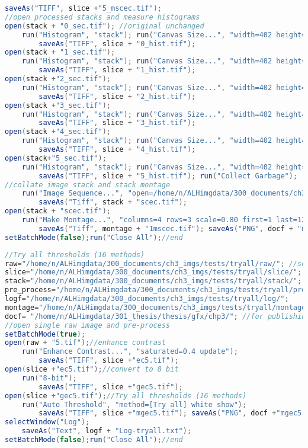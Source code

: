 \begin{lstlisting}[language=java, caption=Stack pre-processing examples.,  label=cd:pre-process-stacks]
		saveAs("TIFF", slice +"5_mscec.tif");
//open processed stacks and measure histograms
open(stack + "0_sec.tif"); //original unchanged
	run("Histogram", "stack"); run("Canvas Size...", "width=402 height=402 position=Center zero");
		saveAs("TIFF", slice + "0_hist.tif"); 
open(stack + "1_sec.tif");
	run("Histogram", "stack"); run("Canvas Size...", "width=402 height=402  position=Center zero");
		saveAs("TIFF", slice + "1_hist.tif");
open(stack +"2_sec.tif");
	run("Histogram", "stack"); run("Canvas Size...", "width=402 height=402  position=Center zero");
		saveAs("TIFF", slice + "2_hist.tif");
open(stack +"3_sec.tif");
	run("Histogram", "stack"); run("Canvas Size...", "width=402 height=402  position=Center zero");
		saveAs("TIFF", slice + "3_hist.tif");
open(stack +"4_sec.tif");	
	run("Histogram", "stack"); run("Canvas Size...", "width=402 height=402  position=Center zero");
		saveAs("TIFF", slice + "4_hist.tif");
open(stack+"5_sec.tif");
	run("Histogram", "stack"); run("Canvas Size...", "width=402 height=402  position=Center zero");
		saveAs("TIFF", slice + "5_hist.tif"); run("Collect Garbage");
//collate image stack and stack montage 
	run("Image Sequence...", "open=/home/n/ALHimgdata/300_documents/ch3_imgs/tests/pre_processing/slice/0_sec.tif sort");
		saveAs("Tiff", stack + "scec.tif");	
open(stack + "scec.tif");
	run("Make Montage...", "columns=4 rows=3 scale=0.80 first=1 last=12 increment=1 border=4 font=20 label");
		saveAs("Tiff", montage + "1mscec.tif"); saveAs("PNG", docf + "mscec.png");
setBatchMode(false);run("Close All");//end
\end{lstlisting}

\begin{lstlisting}[language=java, caption=Thresholding tests., label=cd:tryall-threshold]
//Try all thresholds (16 methods)
raw="/home/n/ALHimgdata/300_documents/ch3_imgs/tests/tryall/raw/"; //source and output dir
slice="/home/n/ALHimgdata/300_documents/ch3_imgs/tests/tryall/slice/"; 
stack="/home/n/ALHimgdata/300_documents/ch3_imgs/tests/tryall/stack/";
pre_process="/home/n/ALHimgdata/300_documents/ch3_imgs/tests/tryall/pre_process/";
logf="/home/n/ALHimgdata/300_documents/ch3_imgs/tests/tryall/log/"; 
montage="/home/n/ALHimgdata/300_documents/ch3_imgs/tests/tryall/montage/";
docf= "/home/n/ALHimgdata/301_thesis/thesis/gfx/chp3/"; //for publishing images
//open single raw image and pre-process
setBatchMode(true);
open(raw + "5.tif");//enhance contrast
	run("Enhance Contrast...", "saturated=0.4 update");
		saveAs("TIFF", slice +"ec5.tif");
open(slice +"ec5.tif");//convert to 8 bit
	run("8-bit"); 
		saveAs("TIFF", slice +"gec5.tif");
open(slice +"gec5.tif");//Try all thresholds (16 methods)	
	run("Auto Threshold", "method=[Try all] white show");
		saveAs("TIFF", slice +"mgec5.tif"); saveAs("PNG", docf +"mgec5.tif");
selectWindow("Log"); 
	saveAs("Text", logf + "Log-tryall.txt");
setBatchMode(false);run("Close All");//end
\end{lstlisting}

